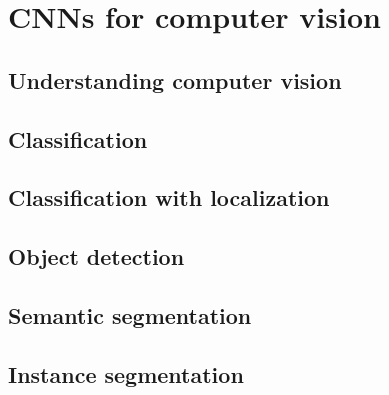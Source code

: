 \chapter{CNNs for computer vision}
\label{image-ann}


\section{Understanding computer vision}
\label{computer-vision}

\section{Classification}
\label{classification}


\section{Classification with localization}
\label{classification-localization}


\section{Object detection}
\label{object-detection}


\section{Semantic segmentation}
\label{semantic-segmentation}


\section{Instance segmentation}
\label{instance-segmentation}


